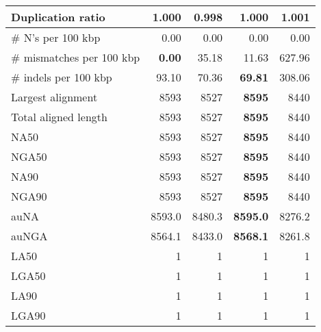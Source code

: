 \documentclass[12pt,a4paper]{article}
\begin{document}
\begin{table}[ht]
\begin{center}
\begin{tabular}{|l*{4}{|r}|}
Duplication ratio & 1.000 & {\bf 0.998} & 1.000 & 1.001 \\ \hline
\# N's per 100 kbp & 0.00 & 0.00 & 0.00 & 0.00 \\ \hline
\# mismatches per 100 kbp & {\bf 0.00} & 35.18 & 11.63 & 627.96 \\ \hline
\# indels per 100 kbp & 93.10 & 70.36 & {\bf 69.81} & 308.06 \\ \hline
Largest alignment & 8593 & 8527 & {\bf 8595} & 8440 \\ \hline
Total aligned length & 8593 & 8527 & {\bf 8595} & 8440 \\ \hline
NA50 & 8593 & 8527 & {\bf 8595} & 8440 \\ \hline
NGA50 & 8593 & 8527 & {\bf 8595} & 8440 \\ \hline
NA90 & 8593 & 8527 & {\bf 8595} & 8440 \\ \hline
NGA90 & 8593 & 8527 & {\bf 8595} & 8440 \\ \hline
auNA & 8593.0 & 8480.3 & {\bf 8595.0} & 8276.2 \\ \hline
auNGA & 8564.1 & 8433.0 & {\bf 8568.1} & 8261.8 \\ \hline
LA50 & 1 & 1 & 1 & 1 \\ \hline
LGA50 & 1 & 1 & 1 & 1 \\ \hline
LA90 & 1 & 1 & 1 & 1 \\ \hline
LGA90 & 1 & 1 & 1 & 1 \\ \hline
\end{tabular}
\end{center}
\end{table}
\end{document}
